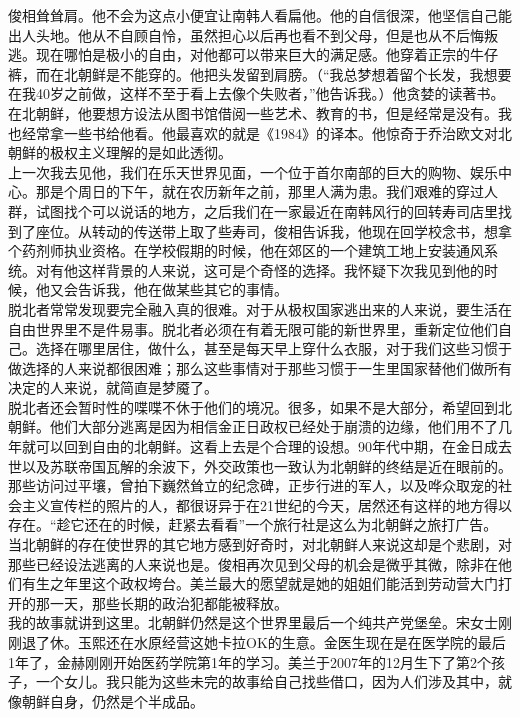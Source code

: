 俊相耸耸肩。他不会为这点小便宜让南韩人看扁他。他的自信很深，他坚信自己能出人头地。他从不自顾自怜，虽然担心以后再也看不到父母，但是也从不后悔叛逃。现在哪怕是极小的自由，对他都可以带来巨大的满足感。他穿着正宗的牛仔裤，而在北朝鲜是不能穿的。他把头发留到肩膀。（“我总梦想着留个长发，我想要在我40岁之前做，这样不至于看上去像个失败者，”他告诉我。）他贪婪的读著书。在北朝鲜，他要想方设法从图书馆借阅一些艺术、教育的书，但是经常是没有。我也经常拿一些书给他看。他最喜欢的就是《1984》的译本。他惊奇于乔治欧文对北朝鲜的极权主义理解的是如此透彻。\\

上一次我去见他，我们在乐天世界见面，一个位于首尔南部的巨大的购物、娱乐中心。那是个周日的下午，就在农历新年之前，那里人满为患。我们艰难的穿过人群，试图找个可以说话的地方，之后我们在一家最近在南韩风行的回转寿司店里找到了座位。从转动的传送带上取了些寿司，俊相告诉我，他现在回学校念书，想拿个药剂师执业资格。在学校假期的时候，他在郊区的一个建筑工地上安装通风系统。对有他这样背景的人来说，这可是个奇怪的选择。我怀疑下次我见到他的时候，他又会告诉我，他在做某些其它的事情。\\

脱北者常常发现要完全融入真的很难。对于从极权国家逃出来的人来说，要生活在自由世界里不是件易事。脱北者必须在有着无限可能的新世界里，重新定位他们自己。选择在哪里居住，做什么，甚至是每天早上穿什么衣服，对于我们这些习惯于做选择的人来说都很困难；那么这些事情对于那些习惯于一生里国家替他们做所有决定的人来说，就简直是梦魇了。\\

脱北者还会暂时性的喋喋不休于他们的境况。很多，如果不是大部分，希望回到北朝鲜。他们大部分逃离是因为相信金正日政权已经处于崩溃的边缘，他们用不了几年就可以回到自由的北朝鲜。这看上去是个合理的设想。90年代中期，在金日成去世以及苏联帝国瓦解的余波下，外交政策也一致认为北朝鲜的终结是近在眼前的。那些访问过平壤，曾拍下巍然耸立的纪念碑，正步行进的军人，以及哗众取宠的社会主义宣传栏的照片的人，都很讶异于在21世纪的今天，居然还有这样的地方得以存在。“趁它还在的时候，赶紧去看看”一个旅行社是这么为北朝鲜之旅打广告。\\

当北朝鲜的存在使世界的其它地方感到好奇时，对北朝鲜人来说这却是个悲剧，对那些已经设法逃离的人来说也是。俊相再次见到父母的机会是微乎其微，除非在他们有生之年里这个政权垮台。美兰最大的愿望就是她的姐姐们能活到劳动营大门打开的那一天，那些长期的政治犯都能被释放。\\

我的故事就讲到这里。北朝鲜仍然是这个世界里最后一个纯共产党堡垒。宋女士刚刚退了休。玉熙还在水原经营这她卡拉OK的生意。金医生现在是在医学院的最后1年了，金赫刚刚开始医药学院第1年的学习。美兰于2007年的12月生下了第2个孩子，一个女儿。我只能为这些未完的故事给自己找些借口，因为人们涉及其中，就像朝鲜自身，仍然是个半成品。\\
